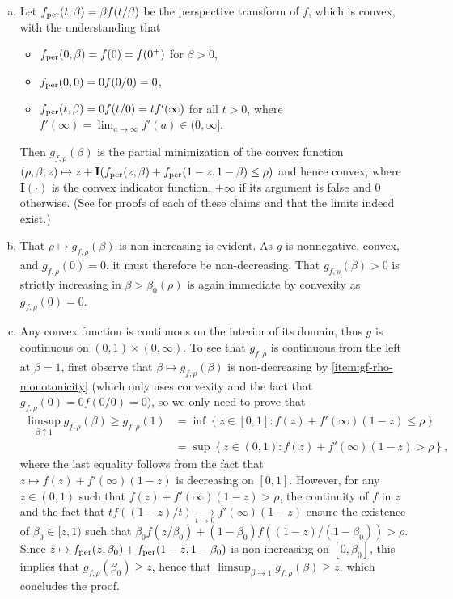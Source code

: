 \begin{enumerate}[(a)]
\item Let $f_{\textup{per}}(t, \beta) = \beta f(t / \beta)$ be the perspective
  transform of $f$, which is convex, with the understanding that
  \begin{itemize}
  \item $f_{\textup{per}}(0, \beta) = f(0) = f(0^+)$ for $\beta >0$,
  \item $f_{\textup{per}}(0, 0) = 0 f(0/0) = 0$,
  \item $f_{\textup{per}}(t, \beta) = 0 f(t/0) = t f'(\infty)$ for all $t>0$, where $f'(\infty) = \lim_{a \to \infty} f'(a) \in (0,\infty]$.
  \end{itemize} 
  Then $g_{f,\rho}(\beta)$ is the partial
  minimization of the convex function $(\rho, \beta, z) \mapsto z +
  \mathbf{I}(f_{\textup{per}}(z, \beta) + f_{\textup{per}}(1-z, 1 - \beta) \le \rho)$ and hence
  convex, where $\mathbf{I}(\cdot)$ is the convex indicator function,
  $+\infty$ if its argument is false
  and $0$ otherwise.
  (See \cite[Ch.~IV]{HiriartUrrutyLe93} for proofs of each of
  these claims and that the limits indeed exist.)
	
\item That $\rho \mapsto g_{f,\rho}(\beta)$ is non-increasing is evident.
  As $g$ is nonnegative, convex, and $g_{f,\rho}(0) = 0$, it must therefore
  be non-decreasing.  That $g_{f,\rho}(\beta) > 0$ is strictly increasing in
  $\beta > \beta_0(\rho)$ is again immediate by convexity as $g_{f,\rho}(0)
  = 0$.
  
  \item Any convex function is continuous on the interior of its domain,
    thus $g$ is continuous on $(0,1) \times (0,\infty)$.  To see that
    $g_{f,\rho}$ is continuous from the left at $\beta = 1$, first observe
    that $\beta \mapsto g_{f,\rho}(\beta)$ is non-decreasing by
    \eqref{item:gf-rho-monotonicity} (which
    only uses convexity and the fact that $g_{f,\rho}(0) = 0 f(0/0) = 0$),
    so we only need to prove that
 \begin{align*}
 \limsup_{\beta \uparrow 1} g_{f,  \rho}(\beta) \ge g_{f,\rho}(1) &= \inf \left\{ z\in [0,1]: f(z) + f'(\infty)(1-z) \le \rho \right\} \\  &= \sup \left\{ z \in (0,1) : f(z) + f'(\infty)(1-z) > \rho \right\},
 \end{align*}
 where the last equality follows from the fact that $z \mapsto f(z) + f'(\infty)(1-z)$ is decreasing on $[0,1]$.
However,  for any $z \in (0,1)$ such that $f(z) + f'(\infty)(1-z) > \rho$,  the continuity of $f$ in $z$ and the fact that $t f((1-z)/t) \underset{t \to 0}{\to} f'(\infty) (1-z)$ ensure the existence of $\beta_0 \in [z,1)$ such that $\beta_0 f(z / \beta_0) + (1-\beta_0) f((1-z)/(1-\beta_0)) > \rho$. 
Since $\tilde{z} \mapsto f_{\textup{per}}(\tilde{z}, \beta_0) + f_{\textup{per}}(1-\tilde{z}, 1-\beta_0)$ is non-increasing on $[0,\beta_0]$, this implies that $g_{f,\rho}(\beta_0) \ge z$, hence that $\limsup_{\beta \to 1} g_{f,\rho}(\beta) \ge z$, which concludes the proof.


\end{enumerate}
